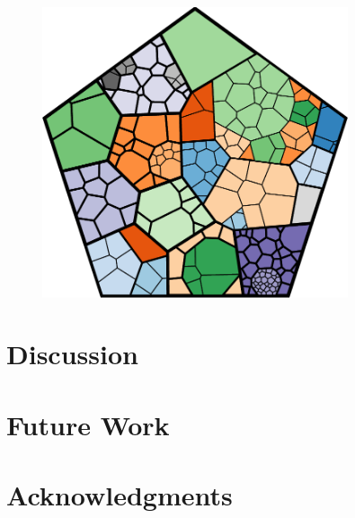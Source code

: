 \documentclass{acm_proc_article-sp} \usepackage{cite}
\begin{document}
\begin{figure}
\centering \includegraphics[width=90mm]{source-images/flare-color-pentagon-100.png}
\caption{}
\end{figure}


\section{Discussion}
\label{sec:discussion}

\section{Future Work}
\label{sec:future}


\section{Acknowledgments}
\label{sec:acknowledgements}




{} 
\end{document}
